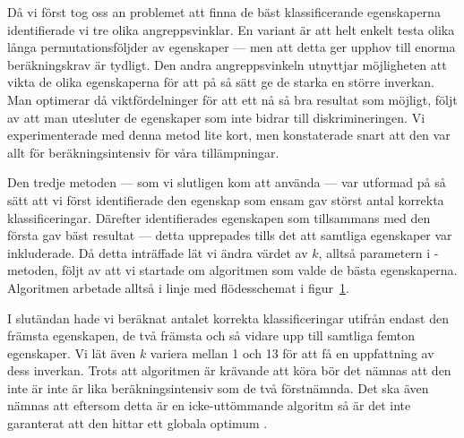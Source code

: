 \documentclass[../rapport_MVEX01-11-05]{subfiles}
\begin{document}
Då vi först tog oss an problemet att finna de bäst klassificerande
egenskaperna identifierade vi tre olika angreppsvinklar. En variant är att helt
enkelt testa olika långa permutationsföljder av egenskaper ---
men att detta ger upphov till enorma beräkningskrav är tydligt. 
Den andra angreppsvinkeln utnyttjar
möjligheten att vikta de olika egenskaperna för att på så sätt ge de starka en
större inverkan. Man optimerar då
viktfördelninger för att ett nå så bra resultat som möjligt, följt av att man
utesluter de egenskaper som inte bidrar till diskrimineringen. Vi experimenterade
med denna metod lite kort, men konstaterade snart att den var allt för 
beräkningsintensiv för våra tillämpningar.

Den tredje metoden --- som vi slutligen kom att
använda --- var utformad på så sätt att vi först identifierade den egenskap som
ensam gav störst antal korrekta klassificeringar. Därefter identifierades
egenskapen som tillsammans med den första gav bäst resultat --- detta
upprepades tills det att samtliga egenskaper var inkluderade. Då detta
inträffade lät vi ändra värdet av $k$, alltså parametern i \knn-metoden, följt av
att vi startade om algoritmen som valde de bästa egenskaperna. Algoritmen
arbetade alltså i linje med flödesschemat i figur~\ref{fig:knn-flowchart}. 

\begin{figure}[tbp]
	\centering 
	\caption{}
	\label{fig:knn-flowchart}
\end{figure}

I slutändan hade vi beräknat antalet korrekta klassificeringar utifrån
endast den främsta egenskapen, de två främsta och så vidare upp till
samtliga femton egenskaper. Vi lät även $k$ variera mellan 1 och 13 för att få
en uppfattning av dess inverkan. Trots att algoritmen är krävande att köra bör
det nämnas att den inte är inte är lika beräkningsintensiv som de två
förstnämnda. Det ska även nämnas att eftersom detta är en icke-uttömmande
algoritm så är det inte garanterat att den hittar ett globala optimum \cite{Cover77}.
\end{document}
